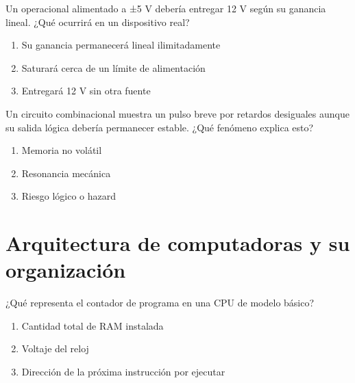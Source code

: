 \noindent\begin{minipage}{\linewidth}\setlength{\parskip}{4pt}\label{q:H-021}
Un operacional alimentado a ±5 V debería entregar 12 V según su ganancia lineal. ¿Qué ocurrirá en un dispositivo real?
\begin{enumerate}[label=\Alph*),nosep]
\item Su ganancia permanecerá lineal ilimitadamente
\item Saturará cerca de un límite de alimentación
\item Entregará 12 V sin otra fuente
\end{enumerate}\end{minipage}\par\medskip

\noindent\begin{minipage}{\linewidth}\setlength{\parskip}{4pt}\label{q:H-022}
Un circuito combinacional muestra un pulso breve por retardos desiguales aunque su salida lógica debería permanecer estable. ¿Qué fenómeno explica esto?
\begin{enumerate}[label=\Alph*),nosep]
\item Memoria no volátil
\item Resonancia mecánica
\item Riesgo lógico o hazard
\end{enumerate}\end{minipage}\par\medskip

\section{Arquitectura de computadoras y su organización}

\noindent\begin{minipage}{\linewidth}\setlength{\parskip}{4pt}\label{q:H-023}
¿Qué representa el contador de programa en una CPU de modelo básico?
\begin{enumerate}[label=\Alph*),nosep]
\item Cantidad total de RAM instalada
\item Voltaje del reloj
\item Dirección de la próxima instrucción por ejecutar
\end{enumerate}\end{minipage}\par\medskip


